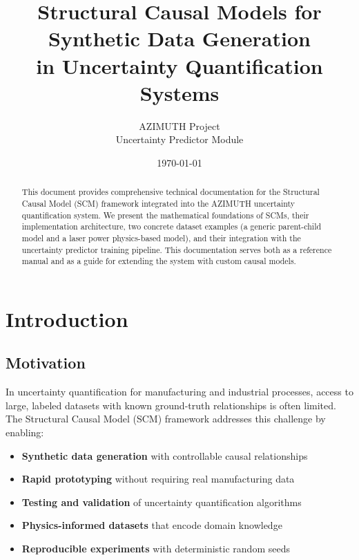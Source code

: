 \documentclass[11pt,a4paper]{article}
\title{\textbf{Structural Causal Models for Synthetic Data Generation\\in Uncertainty Quantification Systems}}
\author{AZIMUTH Project\\Uncertainty Predictor Module}
\date{\today}
\begin{document}
\maketitle

\begin{abstract}
This document provides comprehensive technical documentation for the Structural Causal Model (SCM) framework integrated into the AZIMUTH uncertainty quantification system. We present the mathematical foundations of SCMs, their implementation architecture, two concrete dataset examples (a generic parent-child model and a laser power physics-based model), and their integration with the uncertainty predictor training pipeline. This documentation serves both as a reference manual and as a guide for extending the system with custom causal models.
\end{abstract}

\tableofcontents
\clearpage

\section{Introduction}

\subsection{Motivation}

In uncertainty quantification for manufacturing and industrial processes, access to large, labeled datasets with known ground-truth relationships is often limited. The Structural Causal Model (SCM) framework addresses this challenge by enabling:

\begin{itemize}
    \item \textbf{Synthetic data generation} with controllable causal relationships
    \item \textbf{Rapid prototyping} without requiring real manufacturing data
    \item \textbf{Testing and validation} of uncertainty quantification algorithms
    \item \textbf{Physics-informed datasets} that encode domain knowledge
    \item \textbf{Reproducible experiments} with deterministic random seeds
\end{itemize}
\end{document}
